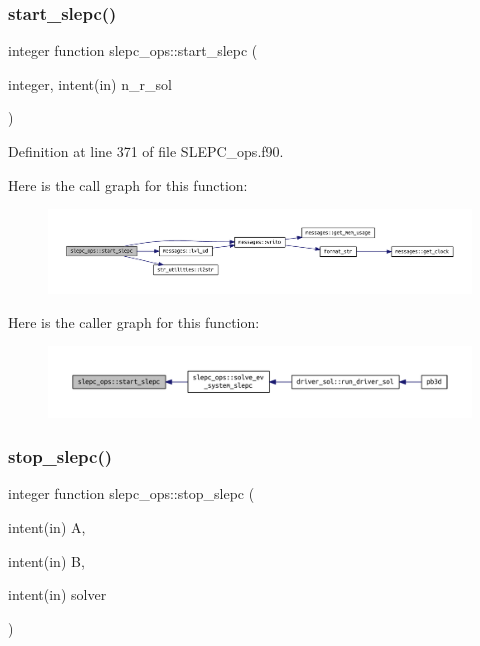 \subsubsection{\texorpdfstring{start\+\_\+slepc()}{start\_slepc()}}
{\footnotesize\ttfamily integer function slepc\+\_\+ops\+::start\+\_\+slepc (\begin{DoxyParamCaption}\item[{integer, intent(in)}]{n\+\_\+r\+\_\+sol }\end{DoxyParamCaption})}



Definition at line 371 of file S\+L\+E\+P\+C\+\_\+ops.\+f90.

Here is the call graph for this function\+:
\nopagebreak
\begin{figure}[H]
\begin{center}
\leavevmode
\includegraphics[width=350pt]{namespaceslepc__ops_a5f69f9325197c270c7975f01360a9648_cgraph}
\end{center}
\end{figure}
Here is the caller graph for this function\+:
\nopagebreak
\begin{figure}[H]
\begin{center}
\leavevmode
\includegraphics[width=350pt]{namespaceslepc__ops_a5f69f9325197c270c7975f01360a9648_icgraph}
\end{center}
\end{figure}
\mbox{\label{namespaceslepc__ops_ae65ae217581e4b5986da87bc9a23acb8}} 
\subsubsection{\texorpdfstring{stop\+\_\+slepc()}{stop\_slepc()}}
{\footnotesize\ttfamily integer function slepc\+\_\+ops\+::stop\+\_\+slepc (\begin{DoxyParamCaption}\item[{intent(in)}]{A,  }\item[{intent(in)}]{B,  }\item[{intent(in)}]{solver }\end{DoxyParamCaption})}



